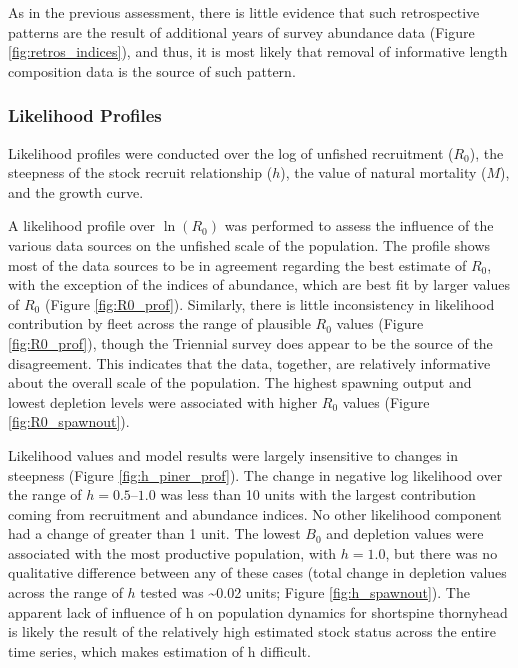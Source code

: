 \documentclass[11pt,
  letterpaper,
]{article}
\begin{document}
As in the previous assessment, there is little evidence that such retrospective patterns are the result of additional years of survey abundance data (Figure \ref{fig:retros_indices}), and thus, it is most likely that removal of informative length composition data is the source of such pattern.

\hypertarget{likelihood-profiles}{%
\subsubsection{Likelihood Profiles}\label{likelihood-profiles}}

Likelihood profiles were conducted over the log of unfished recruitment (\(R_0\)), the steepness of the stock recruit relationship (\(h\)), the value of natural mortality (\(M\)), and the growth curve.

A likelihood profile over \(\ln(R_0)\) was performed to assess the influence of the various data sources on the unfished scale of the population. The profile shows most of the data sources to be in agreement regarding the best estimate of \(R_0\), with the exception of the indices of abundance, which are best fit by larger values of \(R_0\) (Figure \ref{fig:R0_prof}). Similarly, there is little inconsistency in likelihood contribution by fleet across the range of plausible \(R_0\) values (Figure \ref{fig:R0_prof}), though the Triennial survey does appear to be the source of the disagreement. This indicates that the data, together, are relatively informative about the overall scale of the population. The highest spawning output and lowest depletion levels were associated with higher \(R_0\) values (Figure \ref{fig:R0_spawnout}).

Likelihood values and model results were largely insensitive to changes in steepness (Figure \ref{fig:h_piner_prof}). The change in negative log likelihood over the range of \(h = 0.5–1.0\) was less than 10 units with the largest contribution coming from recruitment and abundance indices. No other likelihood component had a change of greater than 1 unit. The lowest \(B_0\) and depletion values were associated with the most productive population, with \(h = 1.0\), but there was no qualitative difference between any of these cases (total change in depletion values across the range of \(h\) tested was \textasciitilde0.02 units; Figure \ref{fig:h_spawnout}). The apparent lack of influence of h on population dynamics for shortspine thornyhead is likely the result of the relatively high estimated stock status across the entire time series, which makes estimation of h difficult.
\end{document}
